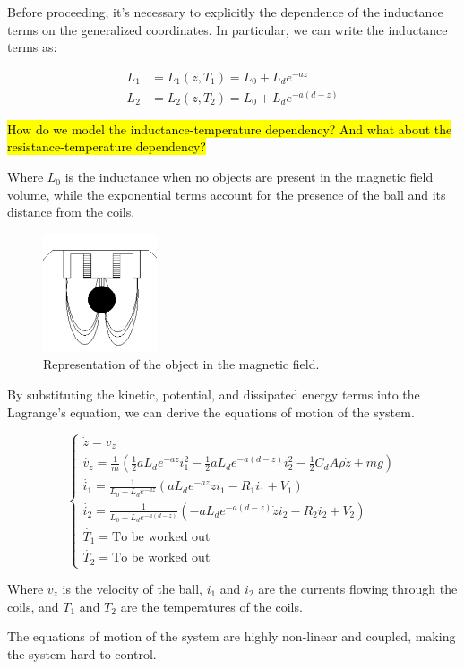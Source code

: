 Before proceeding, it's necessary to explicitly the dependence of the inductance terms on the generalized coordinates.
In particular, we can write the inductance terms as:

\begin{equation}
    \begin{aligned}
        L_1 & = L_1(z, T_1) = L_0 + L_d e^{-az}       \\
        L_2 & = L_2(z, T_2) = L_0 + L_d e^{-a(d - z)}
    \end{aligned}
    \label{eq:inductance}
\end{equation}

\hl{How do we model the inductance-temperature dependency? And what about the resistance-temperature dependency?}

Where $L_0$ is the inductance when no objects are present in the magnetic field volume, while the exponential terms account for the presence of the ball and its distance from the coils.

\begin{figure}[H]
    \centering
    \includegraphics[width=0.3\textwidth]{./img/object_in_magnetic_field.png}
    \caption{Representation of the object in the magnetic field.}
    \label{fig:object_in_magnetic_field}
\end{figure}

By substituting the kinetic, potential, and dissipated energy terms into the Lagrange's equation, we can derive the equations of motion of the system.

\begin{equation}
    \begin{cases}
        \dot{z} = v_z                                                                                                                                         \\
        \dot{v_z} = \frac{1}{m} \left( \frac{1}{2} a L_d e^{-az} i_1^2 - \frac{1}{2} a L_d e^{-a(d - z)} i_2^2 - \frac{1}{2} C_d A \rho \dot{z} + m g \right) \\
        \dot{i_1} = \frac{1}{L_0 + L_d e^{-az}} \left( a L_d e^{-az} \dot{z} i_1 - R_1 i_1 + V_1 \right)                                                      \\
        \dot{i_2} = \frac{1}{L_0 + L_d e^{-a(d - z)}} \left( -a L_d e^{-a(d - z)} \dot{z} i_2 - R_2 i_2 + V_2 \right)                                         \\
        \dot{T_1} = \text{To be worked out}                                                                                                                   \\
        \dot{T_2} = \text{To be worked out}
    \end{cases}
\end{equation}

Where $v_z$ is the velocity of the ball, $i_1$ and $i_2$ are the currents flowing through the coils, and $T_1$ and $T_2$ are the temperatures of the coils.

The equations of motion of the system are highly non-linear and coupled, making the system hard to control.
